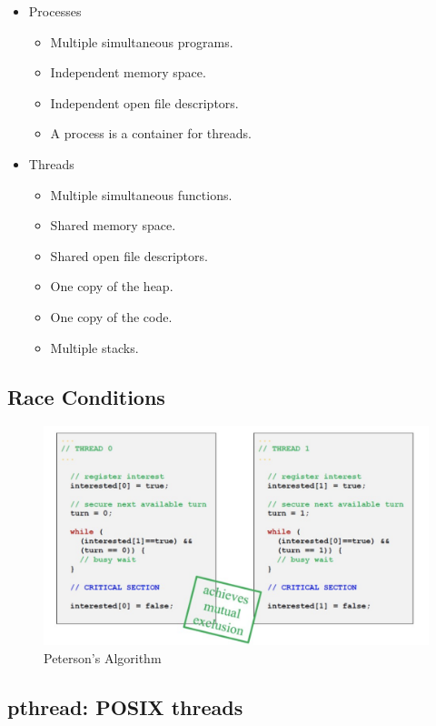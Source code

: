 \documentclass{article}
\begin{document}
\begin{itemize}
    \item Processes
    \begin{itemize}
        \item Multiple simultaneous programs.
        \item Independent memory space.
        \item Independent open file descriptors.
        \item A process is a container for threads.
    \end{itemize}
    \item Threads
    \begin{itemize}
        \item Multiple simultaneous functions.
        \item Shared memory space.
        \item Shared open file descriptors.
        \item One copy of the heap.
        \item One copy of the code.
        \item Multiple stacks.
    \end{itemize}
\end{itemize}

\subsection{Race Conditions}

\begin{figure}[h]
    \centering
    \includegraphics[scale=0.3]{images/peterson.png}
    \caption{Peterson’s Algorithm}
    \label{fig:my_label}
\end{figure}


\subsection{pthread: POSIX threads}
\end{document}
